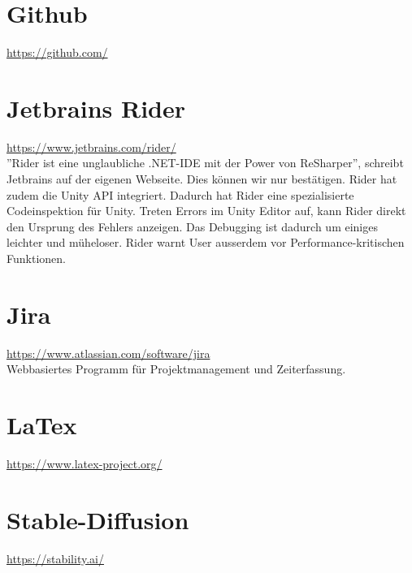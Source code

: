 \section{Github}
\url{https://github.com/}

\section{Jetbrains Rider}
\url{https://www.jetbrains.com/rider/}\\
''Rider ist eine unglaubliche .NET-IDE mit der Power von ReSharper'', schreibt Jetbrains auf der eigenen Webseite. Dies können wir nur bestätigen. Rider hat zudem die Unity API integriert. Dadurch hat Rider eine
spezialisierte Codeinspektion für Unity. Treten Errors im Unity Editor auf, kann Rider direkt den Ursprung des Fehlers anzeigen. Das Debugging ist dadurch um einiges leichter und müheloser. 
Rider warnt User ausserdem vor Performance-kritischen Funktionen. 


\section{Jira}
\url{https://www.atlassian.com/software/jira}\\
Webbasiertes Programm für Projektmanagement und Zeiterfassung.


\section{LaTex}
\url{https://www.latex-project.org/}\\

\section{Stable-Diffusion}
\url{https://stability.ai/}\\

